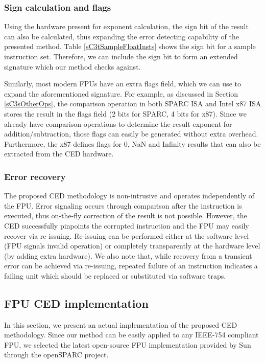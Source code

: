 \documentclass[12pt]{yalephd}
\begin{document}
\subsubsection{Sign calculation and flags}\label{sC3sSignFlags}

Using the hardware present for exponent calculation, the sign bit of the result can also be calculated, thus expanding the error detecting capability of the presented method. Table \ref{sC3tSampleFloatInsts} shows the sign bit for a sample instruction set. Therefore, we can include the sign bit to form an extended signature which our method checks against.

Similarly, most modern FPUs have an extra flags field, which we can use to expand the aforementioned signature. For example, as discussed in Section \ref{sC3sOtherOps}, the comparison operation in both SPARC ISA and Intel x87 ISA stores the result in the flags field (2 bits for SPARC, 4 bits for x87). Since we already have comparison operations to determine the result exponent for addition/subtraction, those flags can easily be generated without extra overhead. Furthermore, the x87 defines flags for 0, NaN and Infinity results that can also be extracted from the CED hardware.

\subsubsection{Error recovery}

The proposed CED methodology is non-intrusive and operates independently of the FPU. Error signaling occurs through comparison after the instruction is executed, thus on-the-fly correction of the result is not possible. However, the CED successfully pinpoints the corrupted instruction and the FPU may easily recover via re-issuing. Re-issuing can be performed either at the software level (FPU signals invalid operation) or completely transparently at the hardware level (by adding extra hardware). We also note that, while recovery from a transient error can be achieved via re-issuing, repeated failure of an instruction indicates a failing unit which should be replaced or substituted via software traps.

\subsection{FPU CED implementation}\label{sC3sCEDImplement}

In this section, we present an actual implementation of the proposed CED methodology. Since our method can be easily applied to any IEEE-754 compliant FPU, we selected the latest open-source FPU implementation provided by Sun through the openSPARC project.
\end{document}
